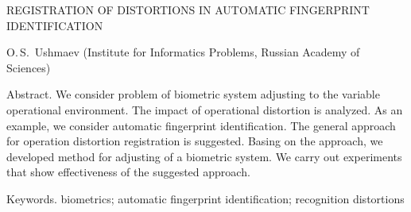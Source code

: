 REGISTRATION OF DISTORTIONS IN AUTOMATIC FINGERPRINT 
IDENTIFICATION

O.\,S.~Ushmaev
(Institute for Informatics Problems, Russian Academy of Sciences)

Abstract. We consider problem of biometric system adjusting to the variable operational environment. 
The impact of operational distortion is analyzed. As an example, we consider automatic fingerprint 
identification. The general approach for operation distortion registration is suggested. Basing on the 
approach, we developed method for adjusting of a biometric system. We carry out experiments that show 
effectiveness of the suggested approach. 

Keywords. biometrics; automatic fingerprint identification; recognition distortions
